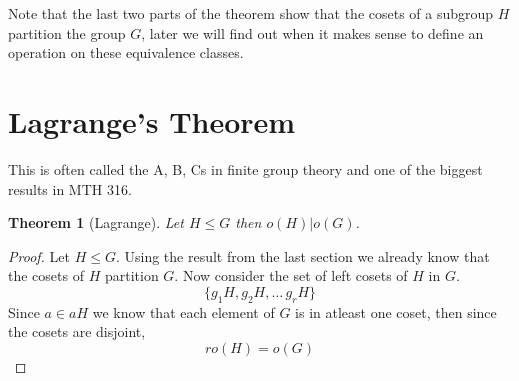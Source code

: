 \documentclass[11pt]{report}
\theoremstyle{break}
\newtheorem{thm}{Theorem}[section]
\begin{document}
Note that the last two parts of the theorem show that the cosets of a subgroup $H$ partition the group $G$, later we will find out 
when it makes sense to define an operation on these equivalence classes. 


\section{Lagrange's Theorem}
This is often called the A, B, Cs in finite group theory and one of the biggest results in MTH 316. 
\begin{thm}[Lagrange]
    Let $H \leq G$ then $o(H) | o(G)$. 
\end{thm}

\begin{proof}
    Let $H \leq G$. Using the result from the last section we already know that the cosets of $H$ partition $G$. Now consider 
    the set of left cosets of $H$ in $G$.
    \[\{g_1H, g_2H, \dots\, g_rH\} \]
    Since $a \in aH$ we know that each element of $G$ is in atleast one coset, then since the cosets are disjoint, 
     \[ro(H) = o(G)\]
    
\end{proof}
\end{document}
